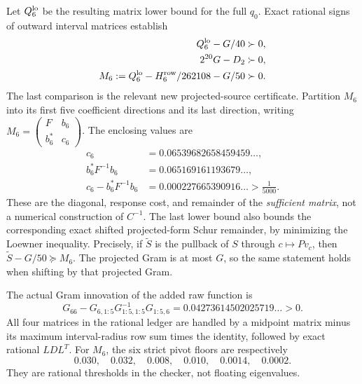 \documentclass[11pt,a4paper]{article}
\numberwithin{equation}{section}
\theoremstyle{definition}\newtheorem{definition}[theorem]{Definition}
\theoremstyle{remark}\newtheorem{remark}[theorem]{Remark}
\begin{document}
Let $Q_6^{\rm lo}$ be the resulting matrix lower bound for the full
$q_0$. Exact rational signs of outward interval matrices establish
\begin{align}
 Q_6^{\rm lo}-G/40&\succ0,\label{sx:eq:finite}\\
 2^{20}G-D_2&\succ0,\label{sx:eq:derivative}\\
 M_6:=Q_6^{\rm lo}-H_6^{\rm row}/262108-G/50&\succ0.\label{sx:eq:M6}
\end{align}
The last comparison is the relevant new projected-source certificate.
Partition $M_6$ into its first five coefficient directions and its last
direction, writing $M_6=\left(\begin{smallmatrix}F&b_6\\b_6^*&c_6\end{smallmatrix}\right)$.
The enclosing values are
\begin{align*}
 c_6&=0.06539682658459459\ldots,\\
 b_6^*F^{-1}b_6&=0.065169161193679\ldots,\\
 c_6-b_6^*F^{-1}b_6&=0.000227665390916\ldots>\frac1{5000}.
\end{align*}
These are the diagonal, response cost, and remainder of the
\emph{sufficient matrix}, not a numerical construction of $C^{-1}$.
The last lower bound also bounds the corresponding exact shifted
projected-form Schur remainder, by minimizing the Loewner inequality.
Precisely, if $\widetilde S$ is the pullback of $S$ through $c\mapsto Pv_c$,
then $\widetilde S-G/50\succeq M_6$. The projected Gram is at most
$G$, so the same statement holds when shifting by that projected Gram.

The actual Gram innovation of the added raw function is
\[
 G_{66}-G_{6,1:5}G_{1:5,1:5}^{-1}G_{1:5,6}
 =0.04273614502025719\ldots>0.
\]
All four matrices in the rational ledger are handled by a midpoint
matrix minus its maximum interval-radius row sum times the identity,
followed by exact rational $LDL^T$. For $M_6$, the six strict pivot
floors are respectively
\[
 0.030,\quad0.032,\quad0.008,\quad0.010,\quad0.0014,\quad0.0002.
\]
They are rational thresholds in the checker, not floating eigenvalues.
\end{document}
